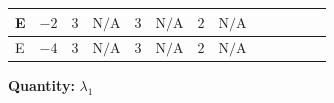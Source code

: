 \documentclass[8pt]{article}
\begin{document}
\begin{landscape}
\begin{longtable}{@{}llcccccc >{\raggedright\arraybackslash}p{0.21\linewidth} >{\raggedright\arraybackslash}p{0.21\linewidth} >{\raggedright\arraybackslash}p{0.21\linewidth}@{}}
\midrule
E & $-2$ & $3$ & $\text{N/A}$ & $3$ & $\text{N/A}$ & $2$ & $\text{N/A}$ & \scriptsize\adjustbox{max width=\linewidth}{$\begin{gathered} +\frac{3 {g_1}^4}{4}\end{gathered}$} & \scriptsize\adjustbox{max width=\linewidth}{$\begin{gathered} +12 {\lambda_1}^2\end{gathered}$} & \scriptsize\adjustbox{max width=\linewidth}{$\begin{gathered} +6 {\lambda_{HS_1}^{(1)}}^2\end{gathered}$} \\
\midrule
E & $-4$ & $3$ & $\text{N/A}$ & $3$ & $\text{N/A}$ & $2$ & $\text{N/A}$ & \scriptsize\adjustbox{max width=\linewidth}{$\begin{gathered} +\frac{3 {g_1}^4}{4}\end{gathered}$} & \scriptsize\adjustbox{max width=\linewidth}{$\begin{gathered} +12 {\lambda_1}^2\end{gathered}$} & \scriptsize\adjustbox{max width=\linewidth}{$\begin{gathered} +6 {\lambda_{HS_1}^{(1)}}^2\end{gathered}$} \\
\midrule
\bottomrule
\end{longtable}
\clearpage
\noindent\textbf{Quantity: }$\lambda_1$\par\smallskip

\end{landscape}
\end{document}
